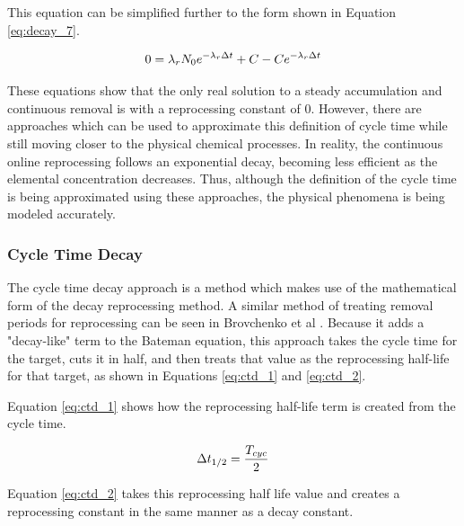 
This equation can be simplified further to the form shown in Equation \eqref{eq:decay_7}.

\begin{equation} \hfill
0 = \lambda_r N_0 e^{-\lambda_r \Delta t} + C - C e^{-\lambda_r \Delta t}
\hfill\label{eq:decay_7} \end{equation}


 These equations show that the only real solution to a steady accumulation and continuous removal is with a reprocessing constant of 0. However, there are approaches which can be used to approximate this definition of cycle time while still moving closer to the physical chemical processes. In reality, the continuous online reprocessing follows an exponential decay, becoming less efficient as the elemental concentration decreases. Thus, although the definition of the cycle time is being approximated using these approaches, the physical phenomena is being modeled accurately.

\subsubsection{Cycle Time Decay}
\label{s:CTD}

The cycle time decay approach is a method which makes use of the mathematical form of the decay reprocessing method. A similar method of treating removal periods for reprocessing can be seen in Brovchenko et al \cite{brovchenko_neutronic_2019}. Because it adds a "decay-like" term to the Bateman equation, this approach takes the cycle time for the target, cuts it in half, and then treats that value as the reprocessing half-life for that target, as shown in  Equations \eqref{eq:ctd_1} and \eqref{eq:ctd_2}.

Equation \eqref{eq:ctd_1} shows how the reprocessing half-life term is created from the cycle time.

\begin{equation} \hfill
\Delta t_{1/2} = \frac{T_{cyc}}{2}
\hfill\label{eq:ctd_1} \end{equation}

Equation \eqref{eq:ctd_2} takes this reprocessing half life value and creates a reprocessing constant in the same manner as a decay constant.

